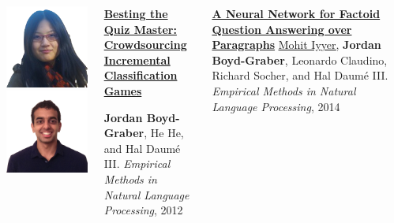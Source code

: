 \documentclass[compress]{beamer}
\begin{document}
\begin{frame}{}

  \begin{columns}
        \includegraphics[width=0.7\linewidth]{general_figures/hehe} \\
        \includegraphics[width=0.7\linewidth]{general_figures/mohit}
        \begin{block}{{\bf
              \href{http://cs.colorado.edu/~jbg//docs/qb_emnlp_2012.pdf}{Besting
                the Quiz Master: Crowdsourcing Incremental
                Classification Games}}}

          {\bf Jordan Boyd-Graber}, He He, and Hal {Daum\'{e} III}. \emph{Empirical Methods in Natural Language Processing}, 2012
        \end{block}

        \begin{block}{ {\bf \href{http://cs.colorado.edu/~jbg//docs/2014_emnlp_qb_rnn.pdf}{A Neural Network for Factoid Question Answering over Paragraphs}}}
\underline{\href{http://cs.umd.edu/~miyyer/}{Mohit Iyyer}}, {\bf Jordan Boyd-Graber}, Leonardo Claudino, Richard Socher, and Hal {Daum\'{e} III}.  \emph{Empirical Methods in Natural Language Processing}, 2014
        \end{block}


  \end{columns}
\end{frame}
\end{document}

